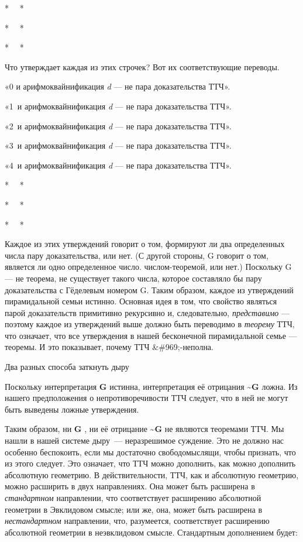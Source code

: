 \documentclass[../main.tex]{subfiles}
\begin{document}
*~~ *

*~~ *

*~~ *

Что утверждает каждая из этих строчек? Вот их соответствующие переводы.

«0 и арифмоквайнификация \emph{d} --- не пара доказательства ТТЧ».

«1~и арифмоквайнификация \emph{d} --- не пара доказательства ТТЧ».

«2~и арифмоквайнификация \emph{d} --- не пара доказательства ТТЧ».

«3~и арифмоквайнификация \emph{d} --- не пара доказательства ТТЧ».

«4~и арифмоквайнификация \emph{d} --- не пара доказательства ТТЧ».

*~~ *

*~~ *

*~~ *

Каждое из этих утверждений говорит о том, формируют ли два определенных числа пару доказательства, или нет. (С другой стороны, G говорит о том, является ли одно определенное число. числом-теоремой, или нет.) Поскольку G --- не теорема, не существует такого числа, которое составляло бы пару доказательства с Гёделевым номером G. Таким образом, каждое из утверждений пирамидальной семьи истинно. Основная идея в том, что свойство являться парой доказательств примитивно рекурсивно и, следовательно, \emph{представимо} --- поэтому каждое из утверждений выше должно быть переводимо в \emph{теорему} ТТЧ, что означает, что все утверждения в нашей бесконечной пирамидальной семье --- теоремы. И это показывает, почему ТТЧ \&\#969;-неполна.

Два разных способа заткнуть дыру

Поскольку интерпретация \textbf{G} истинна, интерпретация её отрицания \textbf{\textasciitilde G} ложна. Из нашего предположения о непротиворечивости ТТЧ следует, что в ней не могут быть выведены ложные утверждения.

Таким образом, ни \textbf{G} , ни её отрицание \textbf{\textasciitilde G} не являются теоремами ТТЧ. Мы нашли в нашей системе дыру~--- неразрешимое суждение. Это не должно нас особенно беспокоить, если мы достаточно свободомыслящи, чтобы признать, что из этого следует. Это означает, что ТТЧ можно дополнить, как можно дополнить абсолютную геометрию. В действительности, ТТЧ, как и абсолютную геометрию, можно расширить в двух направлениях. Она может быть расширена в \emph{стандартном} направлении, что соответствует расширению абсолютной геометрии в Эвклидовом смысле; или же, она, может быть расширена в \emph{нестандартном} направлении, что, разумеется, соответствует расширению абсолютной геометрии в неэвклидовом смысле. Стандартным дополнением будет:
\end{document}
